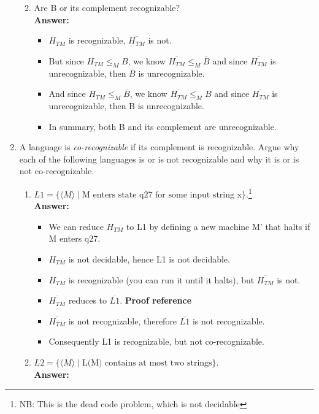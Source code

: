 \documentclass[12pt]{article}
\begin{document}
\begin{enumerate}
\begin{enumerate}
\begin{itemize}
			\end{itemize}
		\item Are B or its complement recognizable?
			\\[.2in]\textbf{Answer:}
			\begin{itemize}
			\item $H_{TM}$ is recognizable, $\overline{H_{TM}}$ is not.
			\item But since $H_{TM} \leq_{M}B$, we know $\overline{H_{TM}} \leq_{M} \overline{B}$ and since $\overline{H_{TM}}$ is unrecognizable, then $\overline{B}$ is unrecognizable.
			\item And since $H_{TM} \leq_{M} \overline{B}$, we know $\overline{H_{TM}} \leq_{M} B$ and since $\overline{H_{TM}}$ is unrecognizable, then B is unrecognizable.
			\item In summary, both B and its complement are unrecognizable.
			\end{itemize}
		\end{enumerate}
	\item A language is \textit{co-recognizable} if its complement is recognizable. Argue why each of the following languages is or is not recognizable and why it is or is not co-recognizable.
		\begin{enumerate}
		\item $L1 = \{\langle M \rangle \mid \mbox{M enters state q27 for some input string x}\}$.\footnote{NB: This is the dead code problem, which is not decidable}
			\\[.2in]\textbf{Answer:}
			\begin{itemize}
			\item We can reduce $H_{TM}$ to L1 by defining a new machine M' that halts if M enters q27.
			\item $H_{TM}$ is not decidable, hence L1 is not decidable.
			\item $H_{TM}$ is recognizable (you can run it until it halts), but $\overline{H_{TM}}$ is not.
			\item $\overline{H_{TM}}$ reduces to $\overline{L1}$. \textbf{Proof reference}
			\item $\overline{H_{TM}}$ is not recognizable, therefore $\overline{L1}$ is not recognizable.
			\item Consequently L1 is recognizable, but not co-recognizable.
			\end{itemize}
		\item $L2 = \{\langle M \rangle \mid \mbox{L(M) contains at most two strings}\}$.
		\\[.2in]\textbf{Answer:}

\end{enumerate}
\end{enumerate}
\end{document}
